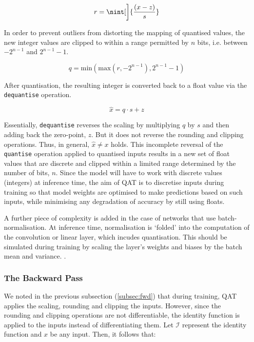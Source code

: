 \documentclass[11pt,a4paper, open=any]{scrbook}
\DeclarePairedDelimiter{\nint}\lfloor\rceil
\begin{document}
\begin{equation}
	r = \nint[\bigg]{\frac{(x - z)}{s}}
\end{equation}

In order to prevent outliers from distorting the mapping of quantised values, the new integer values are clipped to within a range permitted by $n$ bits, i.e. between $-2^{n-1}$ and $2^{n-1} - 1$.

\begin{equation}
	q = \text{min}(\text{max}(r, -2^{n-1}), 2^{n-1}-1)
\end{equation}

After quantisation, the resulting integer is converted back to a float value via the \texttt{dequantise} operation.

\begin{equation}
	\hat{x} = q \cdot s + z
\end{equation}

Essentially, \texttt{dequantise} reverses the scaling by multiplying $q$ by $s$ and then adding back the zero-point, $z$\cite[433]{qat_survey}. But it does not reverse the rounding and clipping operations. Thus, in general, $\hat{x}  \neq x$ holds. This incomplete reversal of the \texttt{quantise} operation applied to quantised inputs results in a new set of float values that are discrete and clipped within a limited range determined by the number of bits, $n$. Since the model will have to work with discrete values (integers) at inference time, the aim of QAT is to discretise inputs during training so that model weights are optimised to make predictions based on such inputs, while minimising any degradation of accuracy by still using floats.

A further piece of complexity is added in the case of networks that use batch-normalisation. At inference time, normalisation is `folded' into the computation of the convolution or linear layer, which incudes quantisation. This should be simulated during training by scaling the layer's weights and biases by the batch mean and variance. \cite[2709]{jacob_qat}.

\subsubsection{The Backward Pass}\label{subsec:bckwd}
We noted in the previous subsection (\ref{subsec:fwd}) that during training, QAT applies the scaling, rounding and clipping the inputs. However, since the rounding and clipping operations are not differentiable, the identity function is applied to the inputs instead of differentiating them. Let $\mathcal{I}$ represent the identity function and $x$ be any input. Then, it follows that:
\end{document}
